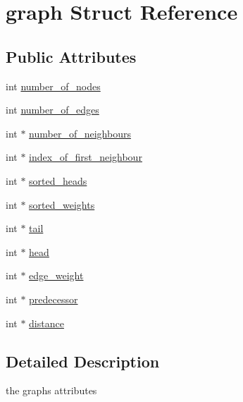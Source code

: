 \hypertarget{structgraph}{\section{graph Struct Reference}
\label{structgraph}
}
\subsection*{Public Attributes}
\begin{DoxyCompactItemize}
\item 
int \hyperlink{structgraph_a5bebff53da4b1da5f65a2ada2fc4ba20}{number\+\_\+of\+\_\+nodes}
\item 
int \hyperlink{structgraph_a87abdc5f72cfd3d9b247978491fdbea5}{number\+\_\+of\+\_\+edges}
\item 
int $\ast$ \hyperlink{structgraph_a2e520373fd6490a3cecfeda1666da47a}{number\+\_\+of\+\_\+neighbours}
\item 
int $\ast$ \hyperlink{structgraph_a276924ecc3886fd1c3fdc42afbcf5352}{index\+\_\+of\+\_\+first\+\_\+neighbour}
\item 
int $\ast$ \hyperlink{structgraph_a785caa95ad9cf6efdb41eeef4db76f0c}{sorted\+\_\+heads}
\item 
int $\ast$ \hyperlink{structgraph_a0af7e336ca28cb1c4b6461892db93ab7}{sorted\+\_\+weights}
\item 
int $\ast$ \hyperlink{structgraph_a7c6e091e35ae88d32cb507752324056d}{tail}
\item 
int $\ast$ \hyperlink{structgraph_af415beb685d5327be1711863fd16ac8c}{head}
\item 
int $\ast$ \hyperlink{structgraph_a2ddac6d6a82c058f61c563170da819eb}{edge\+\_\+weight}
\item 
int $\ast$ \hyperlink{structgraph_ac355c19cbfaeeef1b41202949936cdcc}{predecessor}
\item 
int $\ast$ \hyperlink{structgraph_af714f1a4447ee2e62dae3ae536eb146a}{distance}
\end{DoxyCompactItemize}


\subsection{Detailed Description}
the graphs attributes 

